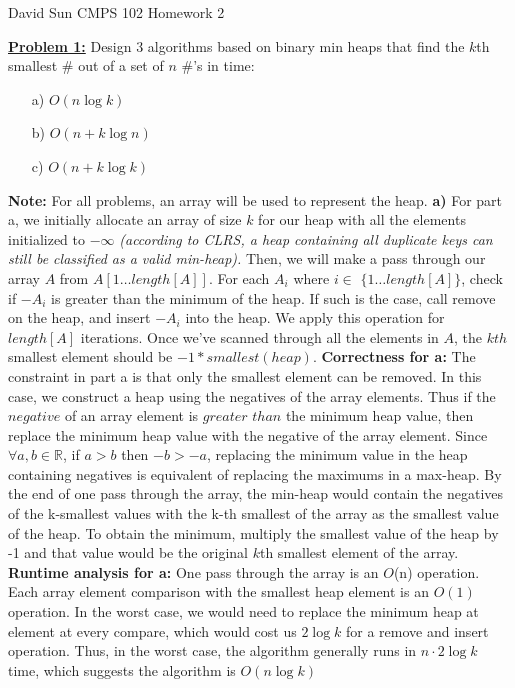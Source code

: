 \documentclass[11pt]{article}
\begin{document}
	\begin{flushleft}
		David Sun	\newline
		CMPS 102	\newline
		Homework 2	\newline
		\item \textbf {\underline{Problem 1:}} Design 3 algorithms based on binary min heaps that find the $k$th smallest \# out of a set of $n$ \#'s in time:
		\begin{enumerate}
			\item[a)] $O(n \log k)$
			\item[b)] $O(n + k \log n)$
			\item[c)] $O(n + k \log k)$
		\end{enumerate}
		\textbf{Note:} For all problems, an array will be used to represent the heap. \newline
		\textbf{a)} For part a, we initially allocate an array of size $k$ for our heap with all the elements initialized to $-\infty$ \emph{(according to CLRS, a heap containing all duplicate keys can still be classified as a valid min-heap).}
		Then, we will make a pass through our array $A$ from $A[1 \dots length[A]]$. For each $A_i$ where $i \in$ $\lbrace 1 \dots length[A] \rbrace$, check if $-A_i$ is greater than the minimum of the heap. If such is the case, call remove on the heap, and insert $-A_i$ into the heap. We apply this operation for $length[A]$ iterations. Once we've scanned through all the elements in $A$, the $kth$ smallest element should be $-1 * smallest(heap)$.
		\newline
		\textbf{Correctness for a:} The constraint in part a is that only the smallest element can be removed. In this case, we construct a heap using the negatives of the array elements. Thus if the $negative$ of an array element is $greater$ $than$ the minimum heap value, then replace the minimum heap value with the negative of the array element. Since $\forall a, b \in \mathbb{R}$, if $a > b$ then $-b > -a$, replacing the minimum value in the heap containing negatives is equivalent of replacing the maximums in a max-heap. By the end of one pass through the array, the min-heap would contain the negatives of the k-smallest values with the k-th smallest of the array as the smallest value of the heap. To obtain the minimum, multiply the smallest value of the heap by -1 and that value would be the original $k$th smallest element of the array.
		\newline
		\textbf{Runtime analysis for a:} One pass through the array is an $O$(n) operation. Each array element comparison with the smallest heap element is an $O(1)$ operation. In the worst case, we would need to replace the minimum heap at element at every compare, which would cost us $2 \log k$ for a remove and insert operation. Thus, in the worst case, the algorithm generally runs in $n\cdot 2\log k$ time, which suggests the algorithm is $O(n \log k)$

\end{flushleft}
\end{document}
